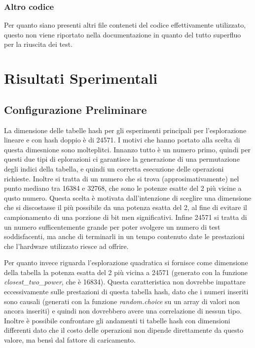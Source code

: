 \documentclass{article}
\begin{document}
\subsubsection{Altro codice}
Per quanto siano presenti altri file conteneti del codice effettivamente utilizzato, questo non viene riportato nella documentazione in quanto del tutto superfluo per la riuscita dei test.
\section{Risultati Sperimentali}

\subsection{Configurazione Preliminare}

La dimensione delle tabelle hash per gli esperimenti principali per l'esplorazione lineare e con hash doppio è di 24571. I motivi che hanno portato alla scelta di questa dimesnione sono molteplitci. Innanzo tutto è un numero primo, quindi per questi due tipi di eplorazioni ci garantisce la generazione di una permutazione degli indici della tabella, e quindi un corretta esecuzione delle operazioni richieste. Inoltre si tratta di un numero che si trova (approsimativamente) nel punto mediano tra 16384 e 32768, che sono le potenze esatte del 2 più vicine a qusto numero. Questa scelta è motivata dall'intenzione di sceglire una dimensione che si discostasse il più possibile da una potenza esatta del 2, al fine di evitare il campionamento di una porzione di bit men significativi. Infine 24571 si tratta di un numero sufficentemente grande per poter svolgere un numero di test soddisfacenti, ma anche di terminarli in un tempo contenuto date le prestazioni che l'hardware utilizzato riesce ad offrire.

Per quanto invece riguarda l'esplorazione quadratica si fornisce come dimensione della tabella la potenza esatta del 2 più vicina a 24571 (generato con la funzione \emph{closest\_two\_power}, che è 16834). Questa caratteristica non dovrebbe impattare eccessivamente sulle prestazioni di questa tabella hash, dato che i numeri inseriti sono causali (generati con la funzione \emph{random.choice} su un array di valori non ancora inseriti) e quindi non dovrebbero avere una correlazione di nessun tipo. Inoltre è possibile confrontare gli andamenti ti tabelle hash con dimensioni differenti dato che il costo delle operazioni non dipende direttamente da questo valore, ma bensì dal fattore di caricamento.
\end{document}
